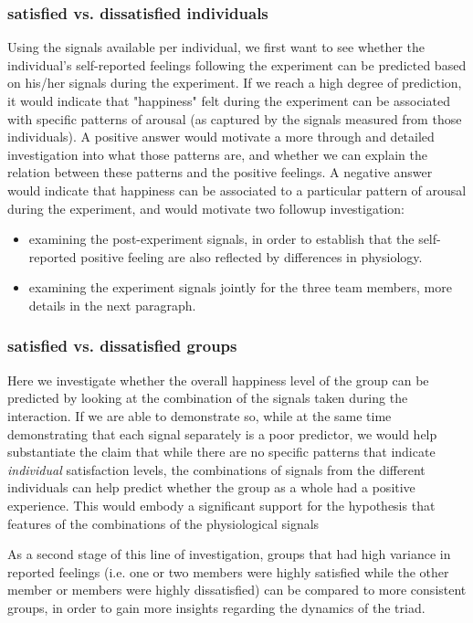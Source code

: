\documentclass[a4paper, 11pt]{article}      %
\begin{document}
\subsubsection{satisfied vs. dissatisfied individuals}
Using the signals available per individual, we first want to see whether the individual's self-reported feelings following the experiment can be predicted based on his/her signals during the experiment. If we reach a high degree of prediction, it would indicate that "happiness" felt during the experiment can be associated with specific patterns of arousal (as captured by the signals measured from those individuals). A positive answer would motivate a more through and detailed investigation into what those patterns are, and whether we can explain the relation between these patterns and the positive feelings. A negative answer would indicate that happiness can be associated to a particular pattern of arousal during the experiment, and would motivate two followup investigation:
\begin{itemize}
    \item examining the post-experiment signals, in order to establish that the self-reported positive feeling are also reflected by differences in physiology.
    \item examining the experiment signals jointly for the three team members, more details in the next paragraph.
\end{itemize}

\subsubsection{satisfied vs. dissatisfied groups}
Here we investigate whether the overall happiness level of the group can be predicted by looking at the combination of the signals taken during the interaction. If we are able to demonstrate so, while at the same time demonstrating that each signal separately is a poor predictor, we would help substantiate the claim that while there are no specific patterns that indicate \emph{individual} satisfaction levels, the combinations of signals from the different individuals can help predict whether the group as a whole had a positive experience. This would embody a significant support for the hypothesis that features of the combinations of the physiological signals 

As a second stage of this line of investigation, groups that had high variance in reported feelings (i.e. one or two members were highly satisfied while the other member or members were highly dissatisfied) can be compared to more consistent groups, in order to gain more insights regarding the dynamics of the triad.
\end{document}
